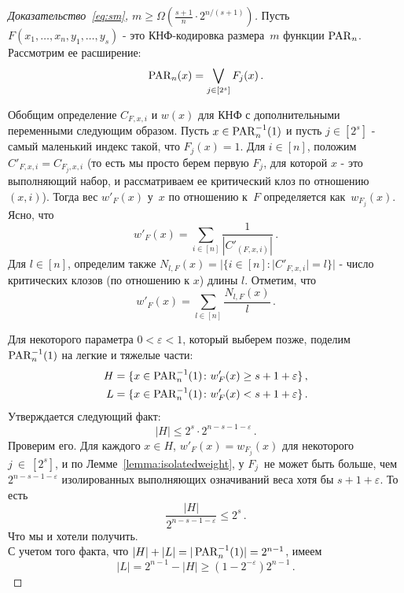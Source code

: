 \begin{proof}[Доказательство~\eqref{eq:sm}, $m \ge \Omega\left(\frac{s+1}{n} \cdot 2^{n/(s+1)}\right)$]
	Пусть $F(x_1, \dotsc, x_n, y_1, \dotsc, y_s)$ - это КНФ-кодировка размера~$m$ функции $\operatorname{PAR}_n$. 
	Рассмотрим ее расширение:
	\[\operatorname{PAR}_n(x)=\bigvee_{j \in [2^s]} F_j(x) \, .\]
	
	Обобщим определение $C_{F,x,i}$ и $w(x)$ для КНФ с дополнительными переменными следующим образом. Пусть $x \in \operatorname{PAR}^{-1}_n(1)$
	и пусть $j \in [2^s]$ - самый маленький индекс такой, что $F_j(x)=1$.
	Для $i \in [n]$, положим $C'_{F,x,i}=C_{F_j,x,i}$ 
	(то есть мы просто берем первую $F_j$, для которой $x$  - это выполняющий набор, и рассматриваем ее критический клоз по отношению $(x,i)$).
	Тогда вес $w'_F(x)$ у~$x$ по отношению к~$F$ определяется как~$w_{F_j}(x)$.
	Ясно, что
	\[w'_F(x) = \sum_{i \in [n]} \frac{1}{|C'_{(F,x,i)}|} \,. \]
	Для $l \in [n]$, определим также $N_{l,F}(x)=|\{i \in [n] \colon |C'_{F,x,i}|=l\}|$
	- число критических клозов (по отношению к $x$) длины $l$.
	Отметим, что
	\begin{equation}\label{eq:weight}
		w'_F(x)=\sum_{l \in [n]}\frac{N_{l,F}(x)}{l} \, .
	\end{equation}
	
	
	Для некоторого параметра $0<\varepsilon<1$, который выберем позже, поделим $\operatorname{PAR}_n^{-1}(1)$
	на легкие и тяжелые части:
	\begin{align}
		H &= \{x \in \operatorname{PAR}_n^{-1}(1)  \colon w'_F(x) \ge s + 1 + \varepsilon\} \, ,\\
		L &= \{x \in \operatorname{PAR}_n^{-1}(1)  \colon w'_F(x) < s + 1 + \varepsilon\} \, .
	\end{align}
	Утверждается следующий факт: 
	\[|H| \le 2^s \cdot 2^{n-s-1-\varepsilon} \, .\]
	Проверим его. Для каждого $x \in H$, $w'_F(x)=w_{F_j}(x)$ для некоторого $j~\in~[2^s]$,
	и по Лемме~\ref{lemma:isolatedweight}, у $F_j$~не может быть больше, чем
	$2^{n-s-1-\varepsilon}$ изолированных выполняющих означиваний веса хотя бы
	$s+1+\varepsilon$. То есть
	\[\frac{|H|}{2^{n-s-1-\varepsilon}} \le 2^s \, .\]
	Что мы и хотели получить. \\
	С учетом того факта, что $|H|+|L|=|\operatorname{PAR}^{-1}_n(1)|=2^{n-1}$, имеем
	\begin{equation}\label{eq:lightsize}
		|L|=2^{n-1} -|H| \ge (1 - 2^{-\varepsilon})2^{n-1} \, .
	\end{equation}
	

\end{proof}
